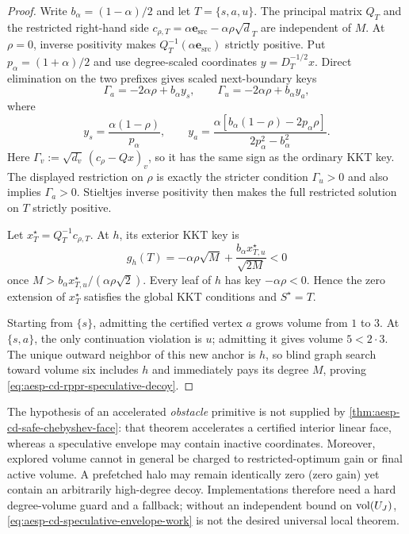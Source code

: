 \begin{proof}
Write $b_\alpha=(1-\alpha)/2$ and let
$T=\{s,a,u\}$.  The principal matrix $Q_T$ and the restricted right-hand side
$c_{\rho,T}=\alpha\mathbf e_{\mathrm{src}}-\alpha\rho\sqrt d_T$ are
independent of $M$.  At $\rho=0$, inverse positivity makes
$Q_T^{-1}(\alpha\mathbf e_{\mathrm{src}})$ strictly positive.
Put $p_\alpha=(1+\alpha)/2$ and use degree-scaled coordinates
$y=D_T^{-1/2}x$.  Direct elimination on the two prefixes gives scaled
next-boundary keys
\begin{equation*}
 \Gamma_a=-2\alpha\rho+b_\alpha y_s,
 \qquad
 \Gamma_u=-2\alpha\rho+b_\alpha y_a,
\end{equation*}
where
\begin{equation*}
 y_s=\frac{\alpha(1-\rho)}{p_\alpha},
 \qquad
 y_a=\frac{\alpha[b_\alpha(1-\rho)-2p_\alpha\rho]}
 {2p_\alpha^2-b_\alpha^2}.
\end{equation*}
Here $\Gamma_v:=\sqrt{d_v}\,(c_\rho-Qx)_v$, so it has the same sign as the
ordinary KKT key.  The displayed restriction on $\rho$ is exactly the stricter condition
$\Gamma_u>0$ and also implies $\Gamma_a>0$.  Stieltjes inverse positivity
then makes the full restricted solution on $T$ strictly positive.

Let $x_T^\star=Q_T^{-1}c_{\rho,T}$.  At $h$, its exterior KKT key is
\begin{equation*}
 g_h(T)=-\alpha\rho\sqrt M
 +\frac{b_\alpha x_{T,u}^\star}{\sqrt{2M}}<0
\end{equation*}
once $M>b_\alpha x_{T,u}^\star/(\alpha\rho\sqrt2)$.  Every leaf of $h$ has
key $-\alpha\rho<0$.  Hence the zero extension of $x_T^\star$ satisfies the
global KKT conditions and $S^\star=T$.

Starting from $\{s\}$, admitting the certified vertex $a$ grows volume from
$1$ to $3$.  At $\{s,a\}$, the only continuation violation is $u$; admitting
it gives volume $5<2\cdot3$.  The unique outward neighbor of this new anchor
is $h$, so blind graph search toward volume six includes $h$ and immediately
pays its degree $M$, proving
\cref{eq:aesp-cd-rppr-speculative-decoy}.
\end{proof}

The hypothesis of an accelerated
\emph{obstacle} primitive is not supplied by
\cref{thm:aesp-cd-safe-chebyshev-face}: that theorem accelerates a certified
interior linear face, whereas a speculative envelope may contain inactive
coordinates.  Moreover, explored volume cannot in general be charged to
restricted-optimum gain or final active volume.  A prefetched halo may remain
identically zero (zero gain) yet contain an arbitrarily high-degree decoy.
Implementations therefore need a hard degree-volume guard and a fallback;
without an independent bound on $\operatorname{vol}(U_J)$,
\cref{eq:aesp-cd-speculative-envelope-work} is not the desired universal
local theorem.

